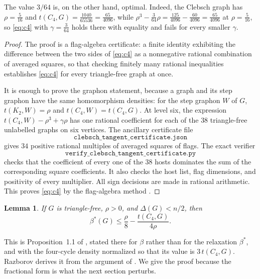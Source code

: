 \documentclass[11pt,reqno]{amsart}
\theoremstyle{plain}
\newtheorem{lemma}[theorem]{Lemma}
\newcommand{\opt}{\beta}
\newcommand{\optf}{\beta^{*}}
\newcommand{\dens}{\rho}
\begin{document}
The value $3/64$ is, on the other hand, optimal.  Indeed, the Clebsch graph has
$\dens=\tfrac5{16}$ and $t(C_4,G)=\tfrac{1040}{65536}=\tfrac{65}{4096}$, while
$\dens^{3}-\tfrac3{64}\dens=\tfrac{125}{4096}-\tfrac{60}{4096}
=\tfrac{65}{4096}$ at $\dens=\tfrac5{16}$, so \eqref{eq:c4} with
$\gamma=\tfrac3{64}$ holds there with equality and fails for every smaller
$\gamma$.

\begin{proof}
The proof is a flag-algebra certificate: a finite identity exhibiting the
difference between the two sides of \eqref{eq:c4} as a nonnegative rational
combination of averaged squares, so that checking finitely many rational
inequalities establishes \eqref{eq:c4} for every triangle-free graph at once.

It is enough to prove the graphon statement, because a graph and its step
graphon have the same homomorphism densities: for the step graphon $W$ of $G$,
$t(K_2,W)=\dens$ and $t(C_4,W)=t(C_4,G)$.  At level six, the expression
$t(C_4,W)-\dens^{3}+\gamma\dens$ has one rational coefficient for each of the
$38$ triangle-free unlabelled graphs on six vertices.  The ancillary
certificate file
\[
 \texttt{clebsch\_tangent\_certificate.json}
\]
gives $34$ positive rational multiples of averaged squares of flags.  The
exact verifier
\[
 \texttt{verify\_clebsch\_tangent\_certificate.py}
\]
checks that the coefficient of every one of the $38$ hosts dominates the sum
of the corresponding square coefficients.  It also checks the host list,
flag dimensions, and positivity of every multiplier.  All sign decisions are
made in rational arithmetic.  This proves \eqref{eq:c4} by the flag-algebra
method \cite{razborov-flag}.
\end{proof}

\begin{lemma}\label{lem:anchor}
If $G$ is triangle-free, $\dens>0$, and $\Delta(G)<n/2$, then
\begin{equation}\label{eq:anchor}
 \optf(G)\le\frac{\dens}8-\frac{t(C_4,G)}{4\dens}.
\end{equation}
\end{lemma}

This is Proposition~1.1 of \cite{razborov-halves}, stated there for $\opt$
rather than for the relaxation $\optf$, and with the four-cycle density
normalized so that its value is $3\,t(C_4,G)$.  Razborov derives it from the
argument of \cite{krivelevich}.  We give the proof because the fractional form
is what the next section perturbs.
\end{document}
